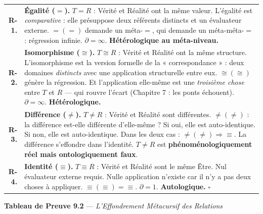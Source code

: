 \documentclass[10pt, openany, oneside]{book}
\renewcommand{\footnotesize}{\fontsize{8.5}{11}\selectfont}
\begin{document}
{\footnotesize
\noindent\begin{tabular}{r p{}}
\textbf{R-1.} & \textbf{Égalité ($=$).} $T = R$ : Vérité et Réalité ont la même valeur. L'égalité est \textit{comparative} : elle présuppose deux référents distincts et un évaluateur externe. $=(=)$ demande un méta-$=$, qui demande un méta-méta-$=$ : régression infinie. $\partial = \infty$. \textbf{Hétérologique au méta-niveau.} \\[0.5em]
\textbf{R-2.} & \textbf{Isomorphisme ($\cong$).} $T \cong R$ : Vérité et Réalité ont la même structure. L'isomorphisme est la version formelle de la « correspondance » : deux domaines \textit{distincts} avec une application structurelle entre eux. $\cong(\cong)$ génère la régression. Et l'application elle-même est une \textit{troisième chose} entre $T$ et $R$ --- qui rouvre l'écart (Chapitre 7 : les ponts échouent). $\partial = \infty$. \textbf{Hétérologique.} \\[0.5em]
\textbf{R-3.} & \textbf{Différence ($\neq$).} $T \neq R$ : Vérité et Réalité sont différentes. $\neq(\neq)$ : la différence est-elle différente d'elle-même ? Si oui, elle est auto-identique. Si non, elle est auto-identique. Dans les deux cas : $\neq(\neq) \Rightarrow \equiv$. La différence s'effondre dans l'identité. $T \neq R$ est \textbf{phénoménologiquement réel mais ontologiquement faux}. \\[0.5em]
\textbf{R-4.} & \textbf{Identité ($\equiv$).} $T \equiv R$ : Vérité et Réalité sont le même Être. Nul évaluateur externe requis. Nulle application n'existe car il n'y a pas deux choses à appliquer. $\equiv(\equiv) = \equiv$. $\partial = 1$. \textbf{Autologique.} $\square$ \\[0.3em]
\end{tabular}
}

\vspace{0.8em}



\vspace{0.5em}

\textbf{Tableau de Preuve 9.2} --- \textit{L'Effondrement Métacursif des Relations}

\vspace{0.5em}
\end{document}
